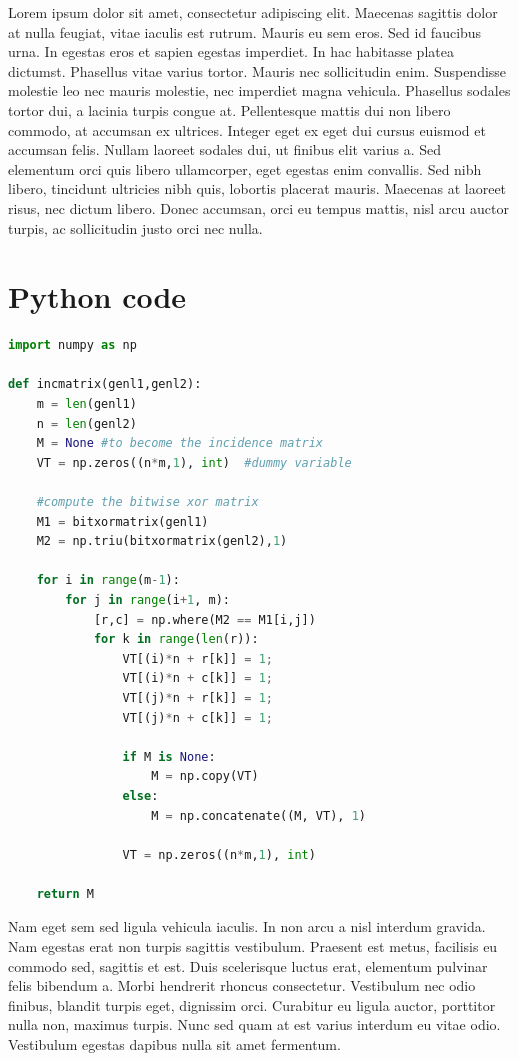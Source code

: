 Lorem ipsum dolor sit amet, consectetur adipiscing elit. Maecenas sagittis dolor at nulla feugiat, vitae iaculis est rutrum. Mauris eu sem eros. Sed id faucibus urna. In egestas eros et sapien egestas imperdiet. In hac habitasse platea dictumst. Phasellus vitae varius tortor. Mauris nec sollicitudin enim. Suspendisse molestie leo nec mauris molestie, nec imperdiet magna vehicula. Phasellus sodales tortor dui, a lacinia turpis congue at. Pellentesque mattis dui non libero commodo, at accumsan ex ultrices. Integer eget ex eget dui cursus euismod et accumsan felis. Nullam laoreet sodales dui, ut finibus elit varius a. Sed elementum orci quis libero ullamcorper, eget egestas enim convallis. Sed nibh libero, tincidunt ultricies nibh quis, lobortis placerat mauris. Maecenas at laoreet risus, nec dictum libero. Donec accumsan, orci eu tempus mattis, nisl arcu auctor turpis, ac sollicitudin justo orci nec nulla.

\clearpage

\section{Python code}

\begin{lstlisting}[language=Python, caption=Python example]
import numpy as np
    
def incmatrix(genl1,genl2):
    m = len(genl1)
    n = len(genl2)
    M = None #to become the incidence matrix
    VT = np.zeros((n*m,1), int)  #dummy variable
    
    #compute the bitwise xor matrix
    M1 = bitxormatrix(genl1)
    M2 = np.triu(bitxormatrix(genl2),1) 

    for i in range(m-1):
        for j in range(i+1, m):
            [r,c] = np.where(M2 == M1[i,j])
            for k in range(len(r)):
                VT[(i)*n + r[k]] = 1;
                VT[(i)*n + c[k]] = 1;
                VT[(j)*n + r[k]] = 1;
                VT[(j)*n + c[k]] = 1;
                
                if M is None:
                    M = np.copy(VT)
                else:
                    M = np.concatenate((M, VT), 1)
                
                VT = np.zeros((n*m,1), int)
    
    return M
\end{lstlisting}

Nam eget sem sed ligula vehicula iaculis. In non arcu a nisl interdum gravida. Nam egestas erat non turpis sagittis vestibulum. Praesent est metus, facilisis eu commodo sed, sagittis et est. Duis scelerisque luctus erat, elementum pulvinar felis bibendum a. Morbi hendrerit rhoncus consectetur. Vestibulum nec odio finibus, blandit turpis eget, dignissim orci. Curabitur eu ligula auctor, porttitor nulla non, maximus turpis. Nunc sed quam at est varius interdum eu vitae odio. Vestibulum egestas dapibus nulla sit amet fermentum.

